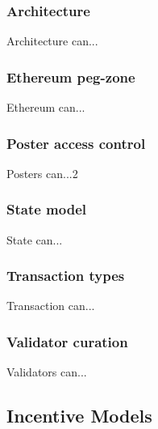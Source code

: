 \documentclass[9pt]{article}
\begin{document}
\subsubsection{Architecture}\label{tm-network-architecture}
\noindent Architecture can...
\bigskip

\subsubsection{Ethereum peg-zone}\label{tm-network-peg}
\noindent Ethereum can...
\bigskip

\subsubsection{Poster access control}\label{tm-network-access}
\noindent Posters can...2
\bigskip

\subsubsection{State model}\label{tm-network-state}
\noindent State can...
\bigskip

\subsubsection{Transaction types}\label{tm-network-tx-types}
\noindent Transaction can...
\bigskip

\subsubsection{Validator curation}\label{tm-network-validators}
\noindent Validators can...
\bigskip


\subsection{Incentive Models}\label{incentive-models}

\clearpage
\pagebreak
\end{document}
